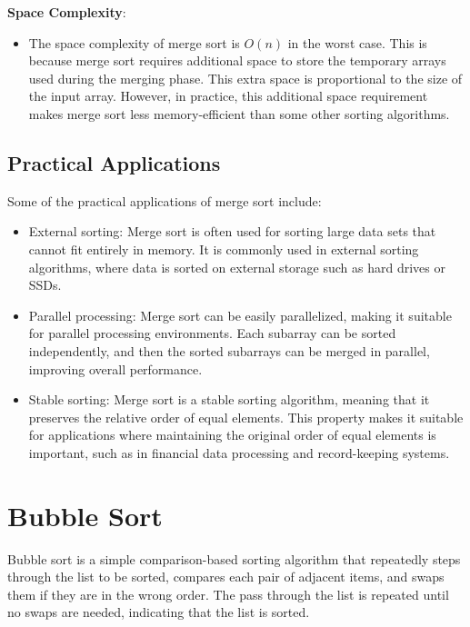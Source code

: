 \documentclass[sigplan,screen]{acmart}
\begin{document}
\textbf{Space Complexity}:
\begin{itemize}
    \item The space complexity of merge sort is $O(n)$ in the worst case. This is because merge sort requires additional space to store the temporary arrays used during the merging phase. This extra space is proportional to the size of the input array. However, in practice, this additional space requirement makes merge sort less memory-efficient than some other sorting algorithms.
\end{itemize}


\subsection{Practical Applications}

Some of the practical applications of merge sort include:
\begin{itemize}
       \item  External sorting: Merge sort is often used for sorting large data sets that cannot fit entirely in memory. It is commonly used in external sorting algorithms, where data is sorted on external storage such as hard drives or SSDs.
       \item Parallel processing: Merge sort can be easily parallelized, making it suitable for parallel processing environments. Each subarray can be sorted independently, and then the sorted subarrays can be merged in parallel, improving overall performance.
            \item Stable sorting: Merge sort is a stable sorting algorithm, meaning that it preserves the relative order of equal elements. This property makes it suitable for applications where maintaining the original order of equal elements is important, such as in financial data processing and record-keeping systems.
\end{itemize}



\section{Bubble Sort}
Bubble sort is a simple comparison-based sorting algorithm that repeatedly steps through the list to be sorted, compares each pair of adjacent items, and swaps them if they are in the wrong order. The pass through the list is repeated until no swaps are needed, indicating that the list is sorted.\newline
\end{document}
